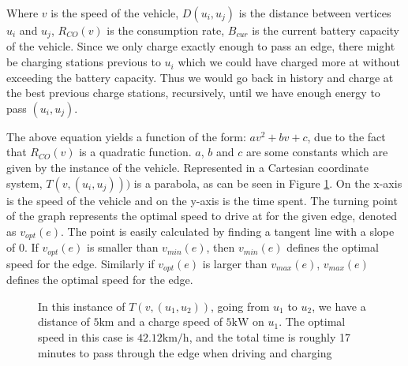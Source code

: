 Where $v$ is the speed of the vehicle, $D(u_i, u_j)$ is the distance between vertices $u_i$ and $u_j$, $R_{CO}(v)$ is the consumption rate, $B_{cur}$ is the current battery capacity of the vehicle. Since we only charge exactly enough to pass an edge, there might be charging stations previous to $u_i$ which we could have charged more at without exceeding the battery capacity. Thus we would go back in history and charge at the best previous charge stations, recursively, until we have enough energy to pass $(u_i, u_j)$.

The above equation yields a function of the form: $av^2 + bv + c$, due to the fact that $R_{CO}(v)$ is a quadratic function. $a$, $b$ and $c$ are some constants which are given by the instance of the vehicle. Represented in a Cartesian coordinate system, $T(v,(u_i, u_j)))$ is a parabola, as can be seen in Figure \ref{fig:graph}. On the x-axis is the speed of the vehicle and on the y-axis is the time spent. The turning point of the graph represents the optimal speed to drive at for the given edge, denoted as $v_{opt}(e)$. The point is easily calculated by finding a tangent line with a slope of $0$. If $v_{opt}(e)$ is smaller than $v_{min}(e)$, then $v_{min}(e)$ defines the optimal speed for the edge. Similarly if $v_{opt}(e)$ is larger than $v_{max}(e)$, $v_{max}(e)$ defines the optimal speed for the edge.

\begin{figure}[!htb]
\label{fig:graph}
% 
\caption{In this instance of $T(v,(u_1, u_2))$, going from $u_1$ to $u_2$, we have a distance of $5 \si{\km}$ and a charge speed of $5 \si{\kW}$ on $u_1$. The optimal speed in this case is $42.12\si{\km\per\hour}$, and the total time is roughly 17 minutes to pass through the edge when driving and charging}
\end{figure}



